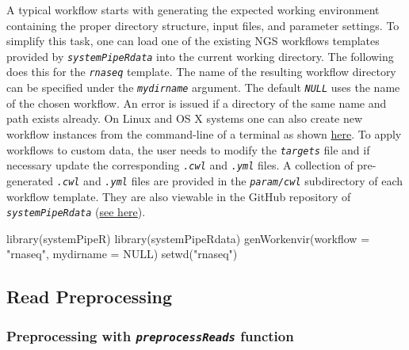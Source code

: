 \documentclass[14pt,]{article}
\newcommand{\hlstr}[1]{\textcolor[rgb]{0.251,0.627,0.251}{#1}}%
\newcommand{\hlstd}[1]{\textcolor[rgb]{0.251,0.251,0.251}{#1}}%
\newcommand{\hlkwc}[1]{\textcolor[rgb]{0.251,0.251,0.251}{#1}}%
\newcommand{\hlkwd}[1]{\textcolor[rgb]{0.878,0.439,0.125}{#1}}%
\newenvironment{Shaded}{\begin{myshaded}}{\end{myshaded}}
\newcommand{\KeywordTok}[1]{\hlkwd{#1}}
\newcommand{\DataTypeTok}[1]{\hlkwc{#1}}
\newcommand{\StringTok}[1]{\hlstr{#1}}
\newcommand{\OtherTok}[1]{{#1}}
\newcommand{\NormalTok}[1]{\hlstd{#1}}
\begin{document}
A typical workflow starts with generating the expected working environment
containing the proper directory structure, input files, and parameter settings.
To simplify this task, one can load one of the existing NGS workflows templates
provided by \emph{\texttt{systemPipeRdata}} into the current working directory. The
following does this for the \emph{\texttt{rnaseq}} template. The name of the resulting
workflow directory can be specified under the \emph{\texttt{mydirname}} argument. The
default \emph{\texttt{NULL}} uses the name of the chosen workflow. An error is issued if a
directory of the same name and path exists already. On Linux and OS X systems
one can also create new workflow instances from the command-line of a terminal as shown
\href{http://bioconductor.org/packages/devel/data/experiment/vignettes/systemPipeRdata/inst/doc/systemPipeRdata.html\#generate-workflow-template}{here}.
To apply workflows to custom data, the user needs to modify the \emph{\texttt{targets}} file and if
necessary update the corresponding \emph{\texttt{.cwl}} and \emph{\texttt{.yml}} files. A collection of pre-generated \emph{\texttt{.cwl}} and \emph{\texttt{.yml}} files are provided in the \emph{\texttt{param/cwl}} subdirectory of each workflow template. They
are also viewable in the GitHub repository of \emph{\texttt{systemPipeRdata}} (\href{https://github.com/tgirke/systemPipeRdata/tree/master/inst/extdata/param}{see
here}).

\begin{Shaded}
\begin{Highlighting}[]
\KeywordTok{library}\NormalTok{(systemPipeR)}
\KeywordTok{library}\NormalTok{(systemPipeRdata)}
\KeywordTok{genWorkenvir}\NormalTok{(}\DataTypeTok{workflow =} \StringTok{"rnaseq"}\NormalTok{, }\DataTypeTok{mydirname =} \OtherTok{NULL}\NormalTok{)}
\KeywordTok{setwd}\NormalTok{(}\StringTok{"rnaseq"}\NormalTok{)}
\end{Highlighting}
\end{Shaded}

\hypertarget{read-preprocessing}{%
\subsection{Read Preprocessing}\label{read-preprocessing}}

\hypertarget{preprocessing-with-preprocessreads-function}{%
\subsubsection{\texorpdfstring{Preprocessing with \emph{\texttt{preprocessReads}} function}{Preprocessing with preprocessReads function}}\label{preprocessing-with-preprocessreads-function}}
\end{document}
